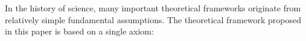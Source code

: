 
In the history of science, many important theoretical frameworks originate from relatively simple fundamental assumptions. The theoretical framework proposed in this paper is based on a single axiom:

